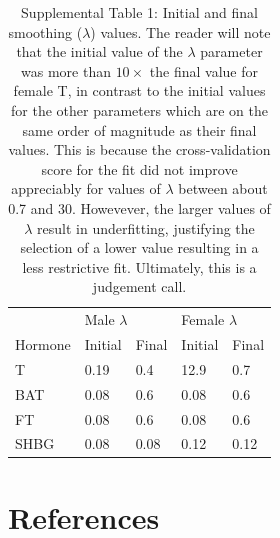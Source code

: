 \documentclass[]{elsarticle} %
\begin{document}
\begin{table}[H]
\caption*{Supplemental Table 1: Initial and final smoothing ($\lambda$) values. The reader will note that the initial value of the $\lambda$ parameter was more than $10\times$ the final value for female T, in contrast to the initial values for the other parameters which are on the same order of magnitude as their final values. This is because the cross-validation score for the fit did not improve appreciably for values of $\lambda$ between about 0.7 and 30.  Howevever, the larger values of $\lambda$ result in underfitting, justifying the selection of a lower value resulting in a less restrictive fit. Ultimately, this is a judgement call. }
\label{tab:my-table}
\begin{tabular}{l|llll}
                          & \multicolumn{2}{l}{Male $\lambda$} & \multicolumn{2}{l}{Female $\lambda$} \\ \cline{2-5} 
Hormone                   & Initial       & Final          & Initial        & Final            \\ \hline
T                         & 0.19           & 0.4            & 12.9          & 0.7              \\
BAT                       & 0.08           & 0.6            & 0.08          & 0.6              \\
FT                        & 0.08           & 0.6            & 0.08          & 0.6              \\
SHBG                      & 0.08           & 0.08           & 0.12          & 0.12       
\end{tabular}
\end{table}

\hypertarget{references}{%
\section*{References}\label{references}}
\end{document}
